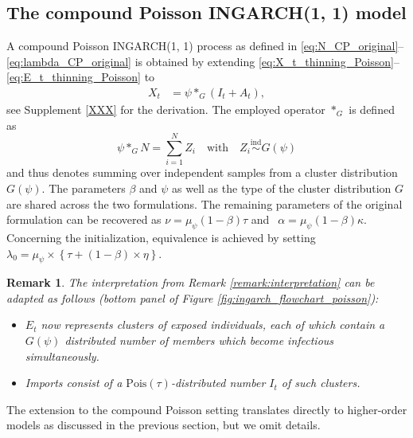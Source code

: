 \documentclass{article}
\newtheorem{remark}{Remark}
\begin{document}
%


\subsection{The compound Poisson INGARCH(1, 1) model}
\label{subsec:compound}

A compound Poisson INGARCH(1, 1) process as defined in \eqref{eq:N_CP_original}--\eqref{eq:lambda_CP_original} is obtained by extending \eqref{eq:X_t_thinning_Poisson}--\eqref{eq:E_t_thinning_Poisson} to
\begin{align}
X_t & = \psi *_G (I_t + A_t)\label{eq:X_t_CP},
\end{align}
see Supplement \ref{XXX} for the derivation. The employed operator $*_G$ is defined as
$$
\psi *_G N = \sum_{i = 1}^N Z_i \ \ \ \text{ with } \ \ \ Z_i \stackrel{\text{ind}}{\sim} G(\psi)
$$
and thus denotes summing over independent samples from a cluster distribution $G(\psi)$. The parameters $\beta$ and $\psi$ as well as the type of the cluster distribution $G$ are shared across the two formulations. The remaining parameters of the original formulation can be recovered as
$
\nu = \mu_\psi(1 - \beta)\tau$ and $ \ \
\alpha = \mu_\psi(1 - \beta)\kappa.
$
Concerning the initialization, equivalence is achieved by setting $\lambda_0 = \mu_\psi\times \left\{\tau + (1 - \beta) \times \eta\right\}$. 

\begin{remark}
The interpretation from Remark \ref{remark:interpretation} can be adapted as follows (bottom panel of Figure \ref{fig:ingarch_flowchart_poisson}):
\begin{itemize}
\item $E_t$ now represents clusters of exposed individuals, each of which contain a $G(\psi)$ distributed number of members which become infectious simultaneously.
\item Imports consist of a $\text{Pois}(\tau)$-distributed number $I_t$ of such clusters.
\end{itemize}
\end{remark}
The extension to the compound Poisson setting translates directly to higher-order models as discussed in the previous section, but we omit details.
\end{document}
